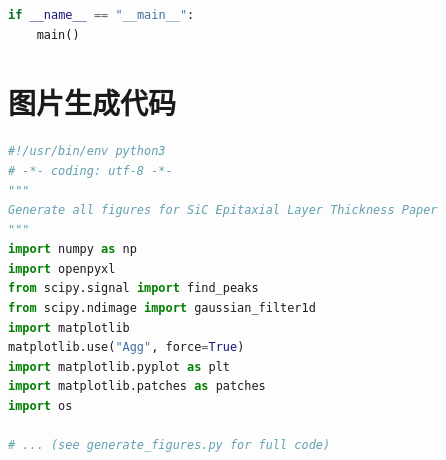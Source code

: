 \documentclass[withoutpreface]{cumcmthesis}
\begin{document}
\begin{appendices}
\begin{lstlisting}[language=python]
if __name__ == "__main__":
    main()
\end{lstlisting}

\section{图片生成代码}

\begin{lstlisting}[language=python]
#!/usr/bin/env python3
# -*- coding: utf-8 -*-
"""
Generate all figures for SiC Epitaxial Layer Thickness Paper
"""
import numpy as np
import openpyxl
from scipy.signal import find_peaks
from scipy.ndimage import gaussian_filter1d
import matplotlib
matplotlib.use("Agg", force=True)
import matplotlib.pyplot as plt
import matplotlib.patches as patches
import os

# ... (see generate_figures.py for full code)
\end{lstlisting}

\end{appendices}
\end{document}
